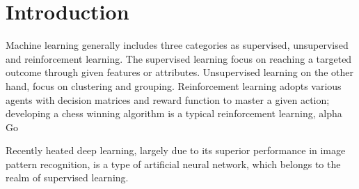 \section{Introduction}

Machine learning generally includes three categories as supervised, unsupervised and reinforcement learning. The supervised learning focus on reaching a targeted outcome through given features or attributes. Unsupervised learning on the other hand, focus on clustering and grouping. Reinforcement learning adopts various agents with decision matrices and reward function to master a given action; developing a chess winning algorithm is a typical reinforcement learning, alpha Go
\par
Recently heated deep learning, largely due to its superior performance in image pattern recognition, is a type of artificial neural network, which belongs to the realm of supervised learning. 
